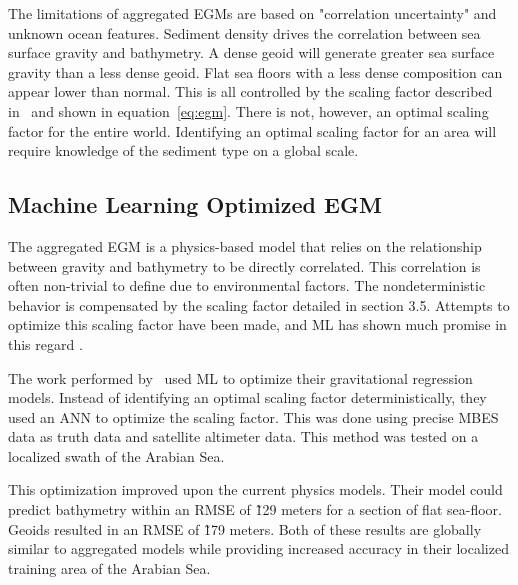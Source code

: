 \par
The limitations of aggregated \ac{EGM}s are based on "correlation uncertainty" and unknown ocean features.
Sediment density drives the correlation between sea surface gravity and bathymetry.
A dense geoid will generate greater sea surface gravity than a less dense geoid.
Flat sea floors with a less dense composition can appear lower than normal.
This is all controlled by the scaling factor described in~\cite{smith1994bathymetric} and shown in equation~\ref{eq:egm}.
There is not, however, an optimal scaling factor for the entire world.
Identifying an optimal scaling factor for an area will require knowledge of the sediment type on a global scale.


\subsection{Machine Learning Optimized \ac{EGM}}\label{subsec:machine-learning-optimizedac}
The aggregated \ac{EGM} is a physics-based model that relies on the relationship between gravity and bathymetry to be directly correlated.
This correlation is often non-trivial to define due to environmental factors.
The nondeterministic behavior is compensated by the scaling factor detailed in section 3.5.
Attempts to optimize this scaling factor have been made, and \ac{ML} has shown much promise in this regard \cite{jena2012prediction}.

\par
The work performed by~\cite{jena2012prediction} used \ac{ML} to optimize their gravitational regression models.
Instead of identifying an optimal scaling factor deterministically, they used an \ac{ANN} to optimize the scaling factor.
This was done using precise \ac{MBES} data as truth data and satellite altimeter data.
This method was tested on a localized swath of the Arabian Sea.

\par
This optimization improved upon the current physics models.
Their model could predict bathymetry within an \ac{RMSE} of \~129 meters for a section of flat sea-floor.
Geoids resulted in an \ac{RMSE} of \~179 meters.
Both of these results are globally similar to aggregated models while providing increased accuracy in their localized training area of the Arabian Sea.

